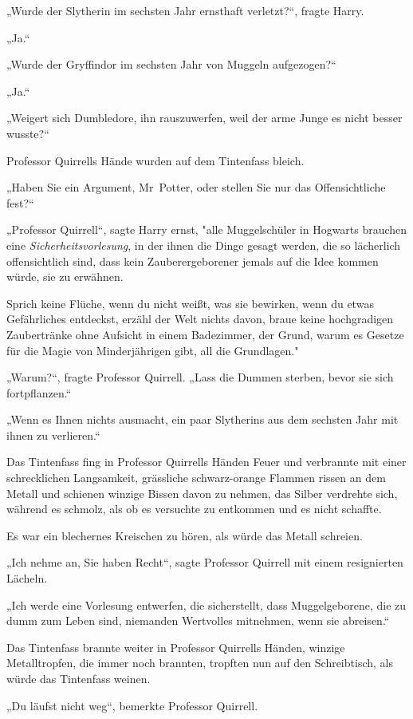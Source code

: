 {„Wurde der Slytherin im sechsten Jahr ernsthaft verletzt?“, fragte Harry.

„Ja.“

„Wurde der Gryffindor im sechsten Jahr von Muggeln aufgezogen?“

„Ja.“

„Weigert sich Dumbledore, ihn rauszuwerfen, weil der arme Junge es nicht besser wusste?“

Professor Quirrells Hände wurden auf dem Tintenfass bleich.

„Haben Sie ein Argument, Mr~Potter, oder stellen Sie nur das Offensichtliche fest?“

„Professor Quirrell“, sagte Harry ernst, "alle Muggelschüler in Hogwarts brauchen eine \emph{Sicherheitsvorlesung}, in der ihnen die Dinge gesagt werden, die so lächerlich offensichtlich sind, dass kein Zauberergeborener jemals auf die Idee kommen würde, sie zu erwähnen.

Sprich keine Flüche, wenn du nicht weißt, was sie bewirken, wenn du etwas Gefährliches entdeckst, erzähl der Welt nichts davon, braue keine hochgradigen Zaubertränke ohne Aufsicht in einem Badezimmer, der Grund, warum es Gesetze für die Magie von Minderjährigen gibt, all die Grundlagen."

„Warum?“, fragte Professor Quirrell. „Lass die Dummen sterben, bevor sie sich fortpflanzen.“

„Wenn es Ihnen nichts ausmacht, ein paar Slytherins aus dem sechsten Jahr mit ihnen zu verlieren.“

Das Tintenfass fing in Professor Quirrells Händen Feuer und verbrannte mit einer schrecklichen Langsamkeit, grässliche schwarz-orange Flammen rissen an dem Metall und schienen winzige Bissen davon zu nehmen, das Silber verdrehte sich, während es schmolz, als ob es versuchte zu entkommen und es nicht schaffte.

Es war ein blechernes Kreischen zu hören, als würde das Metall schreien.

„Ich nehme an, Sie haben Recht“, sagte Professor Quirrell mit einem resignierten Lächeln.

„Ich werde eine Vorlesung entwerfen, die sicherstellt, dass Muggelgeborene, die zu dumm zum Leben sind, niemanden Wertvolles mitnehmen, wenn sie abreisen.“

Das Tintenfass brannte weiter in Professor Quirrells Händen, winzige Metalltropfen, die immer noch brannten, tropften nun auf den Schreibtisch, als würde das Tintenfass weinen.

„Du läufst nicht weg“, bemerkte Professor Quirrell.

}
